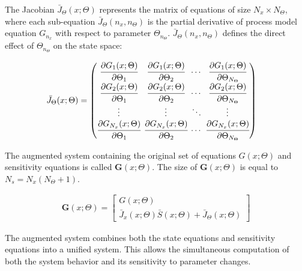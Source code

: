 \documentclass[a4paper,fleqn]{cas-dc}
\begin{document}
	The Jacobian ${\bar{J}_\Theta}(x;\Theta)$ represents the matrix of equations of size $N_x \times N_\Theta$, where each sub-equation ${\bar{J}_\Theta}(n_x,n_\Theta)$ is the partial derivative of process model equation $G_{n_x}$ with respect to parameter $\Theta_{n_\Theta}$. ${\bar{J}_\Theta}(n_x,n_\Theta)$ defines the direct effect of $\Theta_{n_\Theta}$ on the state space:
	
	{\footnotesize
		\begin{align}
			{\bar{J}_\Theta}(x;\Theta) & =
			\begingroup %
			\setlength\arraycolsep{2pt}
			\begin{pmatrix}
				\cfrac{\partial {G_{1}}(x;\Theta)}{\partial {\Theta_{1}}} & \cfrac{\partial {G_{1}}(x;\Theta)}{\partial {\Theta_{2}}} & \cdots & \cfrac{\partial {G_{1}}(x;\Theta)}{\partial {\Theta_{N_\Theta}}}\\
				\cfrac{\partial {G_{2}}(x;\Theta)}{\partial {\Theta_{1}}} & \cfrac{\partial {G_{2}}(x;\Theta)}{\partial {\Theta_{2}}} & \cdots & \cfrac{\partial {G_{2}}(x;\Theta)}{\partial {\Theta_{N_\Theta}}}\\
				\vdots & \vdots & \ddots & \vdots\\
				\cfrac{\partial {G_{N_x}}(x;\Theta)}{\partial {\Theta_{1}}} & \cfrac{\partial {G_{N_x}}(x;\Theta)}{\partial {\Theta_{2}}} & \cdots & \cfrac{\partial {G_{N_x}}(x;\Theta)}{\partial {\Theta_{N_\Theta}}}
			\end{pmatrix}
			\endgroup
	\end{align}}

	{\color{blue}}
	
	The augmented system containing the original set of equations $G(x;\Theta)$ and sensitivity equations is called ${\textbf{G}}\left(x;\Theta\right)$. The size of ${\textbf{G}}\left(x;\Theta\right)$ is equal to $N_s = N_x(N_\Theta + 1)$.
	
	{\footnotesize
		\begin{align}
			{\textbf{G}}\left(x;\Theta\right) = 
			\begin{bmatrix}
				G(x;\Theta)\\
				{\bar{J}_x}(x;\Theta)\bar{S}(x;\Theta) + {\bar{J}_\Theta}(x;\Theta)
			\end{bmatrix}
	\end{align} }

	{\color{blue}The augmented system combines both the state equations and sensitivity equations into a unified system. This allows the simultaneous computation of both the system behavior and its sensitivity to parameter changes.}
	
\end{document}
